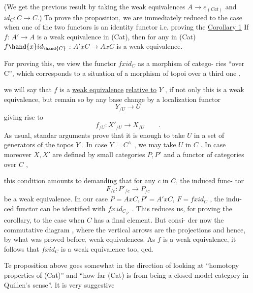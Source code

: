 
(We get the previous result by taking the weak equivalences $A\to e_{(Cat)}$
and $id_C : C \to C$.)  To prove the proposition,  we are immediately reduced
to the case when one of the two functors is  an identity functor  i.e.
proving the
\uline{Corollary 1}  If  $f$:  $A'\to A$ is a weak equivalence in (Cat),  then for any
 in (Cat)  $f\hand{x}id_{\hand{C}}$ : $A'xC \to AxC$  is a weak equivalence.

For proving this,  we view the functor $fxid_C$  as a morphism of catego-%
ries ``over C'',  which corresponds to a situation of a morphism of topoi
over a third one
\qquad ,

we will say that $f$ is a \uline{weak equivalence} \uline{relative to} $Y$ ,  if not only this
is a weak equivalence,  but remain so by any base change by a localization
functor
\[ Y_{/U} \to U \]
giving rise to
\[ f_{/U} : X'_{/U} \to X_{/U} \qquad . \]
As usual,  standar arguments prove that it is enough to take $U$ in a set
of generators of the topos $Y$ .  In case $Y$ =  $C^{\wedge}$\hand{$\hat{}$} ,  we may take $U$ in $C$ .
In case moreover  $X,X'$ are defined by small categories $P,P'$ and a functor
of categories over $C$
\qquad ,

this condition amounts to demanding that for any $c$ in $C$,  the induced func-%
tor
\[ F_{/c} : P'_{/c} \to P_{/c} \]
be a weak equivalence.  In our case $P=AxC,P'=A'xC$, $F = fxid_C$ ,  the indu-%
ced functor can be identified with  $fx\,id_{C_{/c}}$  .  This reduces us,  for
proving the corollary, to the case when $C$ has a final element.  But consi-%
der now the commutative diagram
\qquad ,
where the vertical arrows are the projections and hence,  by what was
proved before,  weak equivalences.  As $f$ is a weak equivalence,  it follows
that $fxid_C$ is a weak equivalence too,  qed.

Te proposition above goes somewhat in the direction of looking at
``homotopy properties of (Cat)''   and ``how far (Cat) is from being a
closed model category in Quillen's sense''.  It is very suggestive 
